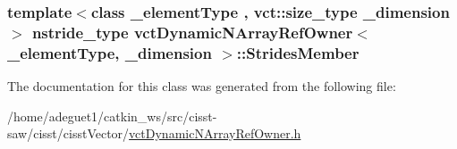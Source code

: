 \hypertarget{classvct_dynamic_n_array_ref_owner_a51d8276e7feb516e682465d378ae2521}{
\subsubsection[{Strides\-Member}]{\setlength{\rightskip}{0pt plus 5cm}template$<$class \-\_\-element\-Type , vct\-::size\-\_\-type \-\_\-dimension$>$ nstride\-\_\-type {\bf vct\-Dynamic\-N\-Array\-Ref\-Owner}$<$ \-\_\-element\-Type, \-\_\-dimension $>$\-::Strides\-Member\hspace{0.3cm}{\ttfamily [protected]}}}\label{classvct_dynamic_n_array_ref_owner_a51d8276e7feb516e682465d378ae2521}


The documentation for this class was generated from the following file\-:\begin{DoxyCompactItemize}
\item 
/home/adeguet1/catkin\-\_\-ws/src/cisst-\/saw/cisst/cisst\-Vector/\hyperlink{vct_dynamic_n_array_ref_owner_8h}{vct\-Dynamic\-N\-Array\-Ref\-Owner.\-h}\end{DoxyCompactItemize}
